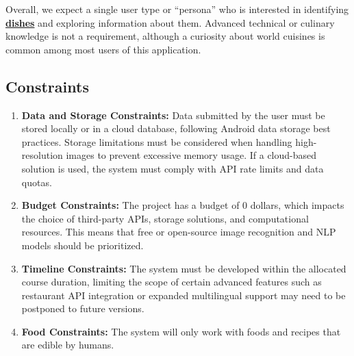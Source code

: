 \documentclass[]{article}
\begin{document}
Overall, we expect a single user type or “persona” who is interested in identifying \hyperref[Dish]{\textbf{dishes}} and exploring information about them. Advanced technical or culinary knowledge is not a requirement, although a curiosity about world cuisines is common among most users of this application.

\subsection{Constraints}
\label{sub:constraints}
\begin{enumerate}
	\item \textbf{Data and Storage Constraints: }Data submitted by the user must be stored locally or in a cloud database, following Android data storage best practices. Storage limitations must be considered when handling high-resolution images to prevent excessive memory usage. If a cloud-based solution is used, the system must comply with API rate limits and data quotas.
	\item \textbf{Budget Constraints: }The project has a budget of 0 dollars, which impacts the choice of third-party APIs, storage solutions, and computational resources. This means that free or open-source image recognition and NLP models should be prioritized.
	\item \textbf{Timeline Constraints: }The system must be developed within the allocated course duration, limiting the scope of certain advanced features such as restaurant API integration or expanded multilingual support may need to be postponed to future versions.
	\item \textbf{Food Constraints: } The system will only work with foods and recipes that are edible by humans.
\end{enumerate}
\end{document}
